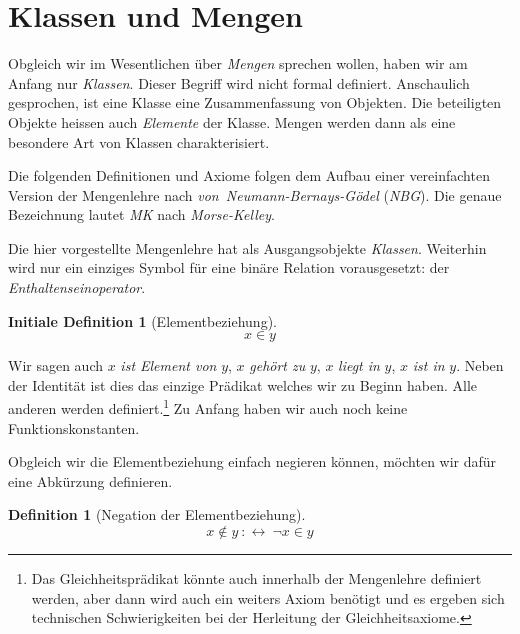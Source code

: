 \documentclass[a4paper,german,10pt,twoside]{book}
\theoremstyle{definition}
\newtheorem{defn}[thm]{Definition}
\newtheorem{idefn}[thm]{Initiale Definition}
\theoremstyle{remark}
\begin{document}
\section{Klassen und Mengen} \label{chapter2_section0} \hypertarget{chapter2_section0}{}
Obgleich wir im Wesentlichen {\"u}ber \emph{Mengen} sprechen wollen, haben wir am Anfang nur \emph{Klassen}. Dieser Begriff wird nicht formal definiert. Anschaulich gesprochen, ist eine Klasse eine Zusammenfassung von Objekten. Die beteiligten Objekte heissen auch \emph{Elemente} der Klasse.
Mengen werden dann als eine besondere Art von Klassen charakterisiert.

\par
Die folgenden Definitionen und Axiome folgen dem Aufbau einer vereinfachten Version der Mengenlehre nach \emph{von~Neumann-Bernays-G{\"o}del} (\emph{NBG}). Die genaue Bezeichnung lautet \emph{MK} nach \emph{Morse-Kelley}.

\par
Die hier vorgestellte Mengenlehre hat als Ausgangsobjekte \emph{Klassen}.
Weiterhin wird nur ein einziges Symbol f{\"u}r eine bin{\"a}re Relation vorausgesetzt: der \emph{Enthaltenseinoperator}.

\begin{idefn}[Elementbeziehung]
\label{definition:in} \hypertarget{definition:in}{}
$$x \in y$$

\end{idefn}

Wir sagen auch $x$ \emph{ist Element von} $y$, $x$ \emph{geh{\"o}rt zu} $y$, $x$ \emph{liegt in} $y$, $x$ \emph{ist in} $y$.
Neben der Identit{\"a}t ist dies das einzige Pr{\"a}dikat welches wir zu Beginn haben. Alle anderen werden definiert.\footnote{Das Gleichheitspr{\"a}dikat k{\"o}nnte auch innerhalb der Mengenlehre definiert werden, aber dann wird auch ein weiters Axiom ben{\"o}tigt und es ergeben sich technischen Schwierigkeiten bei der Herleitung der Gleichheitsaxiome.} Zu Anfang haben wir auch noch keine Funktionskonstanten.


\par
Obgleich wir die Elementbeziehung einfach negieren k{\"o}nnen, m{\"o}chten wir daf{\"u}r eine Abk{\"u}rzung definieren.

\begin{defn}[Negation der Elementbeziehung]
\label{definition:notIn} \hypertarget{definition:notIn}{}
$$x \notin y\ :\leftrightarrow \ \neg x \in y$$

\end{defn}
\end{document}
